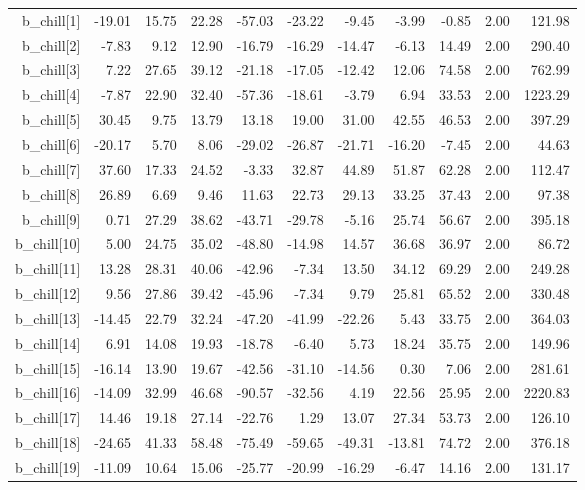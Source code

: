 \documentclass[11pt]{article}
\begin{document}
\begin{table}[ht]
\begin{tabular}{rrrrrrrrrrr}
  b\_chill[1] & -19.01 & 15.75 & 22.28 & -57.03 & -23.22 & -9.45 & -3.99 & -0.85 & 2.00 & 121.98 \\ 
  b\_chill[2] & -7.83 & 9.12 & 12.90 & -16.79 & -16.29 & -14.47 & -6.13 & 14.49 & 2.00 & 290.40 \\ 
  b\_chill[3] & 7.22 & 27.65 & 39.12 & -21.18 & -17.05 & -12.42 & 12.06 & 74.58 & 2.00 & 762.99 \\ 
  b\_chill[4] & -7.87 & 22.90 & 32.40 & -57.36 & -18.61 & -3.79 & 6.94 & 33.53 & 2.00 & 1223.29 \\ 
  b\_chill[5] & 30.45 & 9.75 & 13.79 & 13.18 & 19.00 & 31.00 & 42.55 & 46.53 & 2.00 & 397.29 \\ 
  b\_chill[6] & -20.17 & 5.70 & 8.06 & -29.02 & -26.87 & -21.71 & -16.20 & -7.45 & 2.00 & 44.63 \\ 
  b\_chill[7] & 37.60 & 17.33 & 24.52 & -3.33 & 32.87 & 44.89 & 51.87 & 62.28 & 2.00 & 112.47 \\ 
  b\_chill[8] & 26.89 & 6.69 & 9.46 & 11.63 & 22.73 & 29.13 & 33.25 & 37.43 & 2.00 & 97.38 \\ 
  b\_chill[9] & 0.71 & 27.29 & 38.62 & -43.71 & -29.78 & -5.16 & 25.74 & 56.67 & 2.00 & 395.18 \\ 
  b\_chill[10] & 5.00 & 24.75 & 35.02 & -48.80 & -14.98 & 14.57 & 36.68 & 36.97 & 2.00 & 86.72 \\ 
  b\_chill[11] & 13.28 & 28.31 & 40.06 & -42.96 & -7.34 & 13.50 & 34.12 & 69.29 & 2.00 & 249.28 \\ 
  b\_chill[12] & 9.56 & 27.86 & 39.42 & -45.96 & -7.34 & 9.79 & 25.81 & 65.52 & 2.00 & 330.48 \\ 
  b\_chill[13] & -14.45 & 22.79 & 32.24 & -47.20 & -41.99 & -22.26 & 5.43 & 33.75 & 2.00 & 364.03 \\ 
  b\_chill[14] & 6.91 & 14.08 & 19.93 & -18.78 & -6.40 & 5.73 & 18.24 & 35.75 & 2.00 & 149.96 \\ 
  b\_chill[15] & -16.14 & 13.90 & 19.67 & -42.56 & -31.10 & -14.56 & 0.30 & 7.06 & 2.00 & 281.61 \\ 
  b\_chill[16] & -14.09 & 32.99 & 46.68 & -90.57 & -32.56 & 4.19 & 22.56 & 25.95 & 2.00 & 2220.83 \\ 
  b\_chill[17] & 14.46 & 19.18 & 27.14 & -22.76 & 1.29 & 13.07 & 27.34 & 53.73 & 2.00 & 126.10 \\ 
  b\_chill[18] & -24.65 & 41.33 & 58.48 & -75.49 & -59.65 & -49.31 & -13.81 & 74.72 & 2.00 & 376.18 \\ 
  b\_chill[19] & -11.09 & 10.64 & 15.06 & -25.77 & -20.99 & -16.29 & -6.47 & 14.16 & 2.00 & 131.17 \\ 

\end{tabular}
\end{table}
\end{document}
